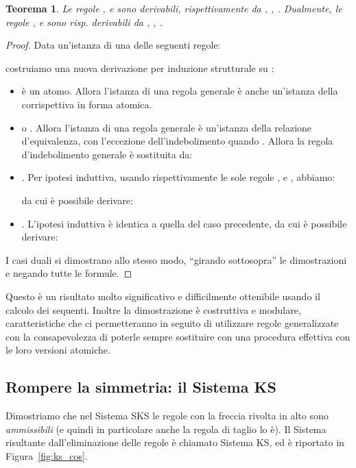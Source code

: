 \documentclass[12pt,a4paper,openright,twoside]{report}
\newtheorem{thm}{Teorema}[section]
\begin{document}
\begin{thm}\label{thm:sksg_atomic}
Le regole ,  e  sono derivabili, rispettivamente da , , . Dualmente, le regole ,  e  sono risp. derivabili da , , .
\end{thm}
\begin{proof}
Data un'istanza di una delle seguenti regole:

costruiamo una nuova derivazione per induzione strutturale su :
\begin{itemize}
	\item  \`e un atomo. Allora l'istanza di una regola generale \`e anche un'istanza della corrispettiva in forma atomica.
	\item  o . Allora l'istanza di una regola generale \`e un'istanza della relazione d'equivalenza, con l'eccezione dell'indebolimento quando . Allora la regola d'indebolimento generale \`e sostituita da:
	
	\item . Per ipotesi induttiva, usando rispettivamente le sole regole ,  e , abbiamo:
	
	da cui \`e possibile derivare:
	

	\item . L'ipotesi induttiva \`e identica a quella del caso precedente,	da cui \`e possibile derivare:
	
\end{itemize}

I casi duali si dimostrano allo stesso modo, ``girando sottosopra'' le dimostrazioni e negando tutte le formule.
\end{proof}

Questo \`e un risultato molto significativo e difficilmente ottenibile usando il calcolo dei sequenti. Inoltre la dimostrazione \`e costruttiva e modulare, caratteristiche che ci permetteranno in seguito di utilizzare regole generalizzate con la consapevolezza di poterle sempre sostituire con una procedura effettiva con le loro versioni atomiche.

\subsection{Rompere la simmetria: il Sistema KS} 
Dimostriamo che nel Sistema \textsf{SKS} le regole con la freccia rivolta in alto  sono \emph{ammissibili} (e quindi in particolare anche la regola di taglio lo \`e). Il Sistema risultante dall'eliminazione delle regole  \`e chiamato Sistema \textsf{KS}, ed \`e riportato in Figura~\ref{fig:ks_cos}. 
\end{document}
